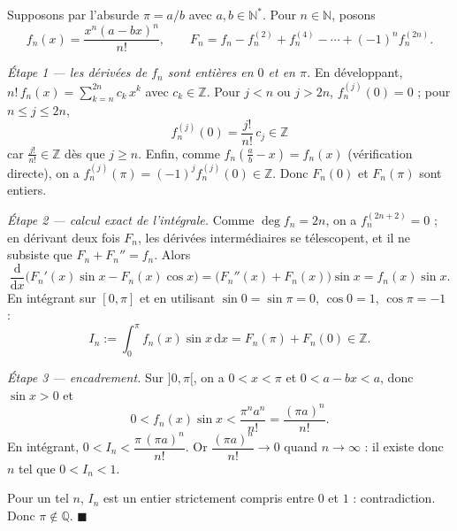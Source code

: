 \begin{mdframed}[style=proofbar]
  Supposons par l'absurde $\pi = a/b$ avec $a, b \in \mathbb{N}^*$. Pour
  $n \in \mathbb{N}$, posons
  \[
    f_n(x) = \frac{x^n (a - bx)^n}{n!}, \qquad
    F_n = f_n - f_n^{(2)} + f_n^{(4)} - \cdots + (-1)^n f_n^{(2n)} .
  \]

  \smallskip\noindent
  \textit{Étape 1 — les dérivées de $f_n$ sont entières en $0$ et en $\pi$.}\enspace
  En développant, $n!\,f_n(x) = \sum_{k=n}^{2n} c_k\,x^k$ avec $c_k \in \mathbb{Z}$.
  Pour $j < n$ ou $j > 2n$, $f_n^{(j)}(0) = 0$ ; pour $n \leq j \leq 2n$,
  \[
    f_n^{(j)}(0) = \frac{j!}{n!}\,c_j \in \mathbb{Z}
  \]
  car $\frac{j!}{n!} \in \mathbb{Z}$ dès que $j \geq n$. Enfin, comme
  $f_n\!\left(\tfrac{a}{b} - x\right) = f_n(x)$ (vérification directe), on a
  $f_n^{(j)}(\pi) = (-1)^j f_n^{(j)}(0) \in \mathbb{Z}$. Donc $F_n(0)$ et
  $F_n(\pi)$ sont entiers.

  \smallskip\noindent
  \textit{Étape 2 — calcul exact de l'intégrale.}\enspace
  Comme $\deg f_n = 2n$, on a $f_n^{(2n+2)} = 0$ ; en dérivant deux fois $F_n$,
  les dérivées intermédiaires se télescopent, et il ne subsiste que
  $F_n + F_n'' = f_n$. Alors
  \[
    \frac{\mathrm{d}}{\mathrm{d}x}\bigl(F_n'(x)\sin x - F_n(x)\cos x\bigr)
    = \bigl(F_n''(x) + F_n(x)\bigr)\sin x = f_n(x)\sin x .
  \]
  En intégrant sur $[0,\pi]$ et en utilisant $\sin 0 = \sin \pi = 0$,
  $\cos 0 = 1$, $\cos \pi = -1$ :
  \[
    I_n := \int_0^\pi f_n(x)\sin x\,\mathrm{d}x = F_n(\pi) + F_n(0) \in \mathbb{Z}.
  \]

  \smallskip\noindent
  \textit{Étape 3 — encadrement.}\enspace
  Sur $]0,\pi[$, on a $0 < x < \pi$ et $0 < a - bx < a$, donc $\sin x > 0$ et
  \[
    0 < f_n(x)\sin x < \frac{\pi^n a^n}{n!} = \frac{(\pi a)^n}{n!} .
  \]
  En intégrant, $0 < I_n < \dfrac{\pi\,(\pi a)^n}{n!}$. Or
  $\dfrac{(\pi a)^n}{n!} \to 0$ quand $n \to \infty$ : il existe donc $n$ tel que
  $0 < I_n < 1$.

  \smallskip\noindent
  Pour un tel $n$, $I_n$ est un entier strictement compris entre $0$ et $1$ :
  contradiction. Donc $\pi \notin \mathbb{Q}$.
  $\blacksquare$
\end{mdframed}


